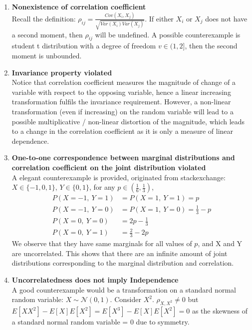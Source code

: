 \documentclass[12pt]{report}
\newcommand{\1}{\mathbf{1}}
\begin{document}
\begin{flushleft}
\begin{enumerate}
\item \textbf{Nonexistence of correlation coefficient} \\
\vspace{0.5cm}
Recall the definition: $\rho_{ij} = \frac{Cov(X_{i},X_{j})}{\sqrt{Var(X_{i})Var(X_{j})}}$. If either $X_{i}$ or $X_{j}$ does not have a second moment, then $\rho_{ij}$ will be undefined. A possible counterexample is student t distribution with a degree of freedom $v \in (1,2]$, then the second moment is unbounded.
\item \textbf{Invariance property violated} \\
\vspace{0.5cm}
Notice that correlation coefficient measures the magnitude of change of a variable with respect to the opposing variable, hence a linear increasing transformation fulfils the invariance requirement. However, a non-linear transformation (even if increasing) on the random variable will lead to a possible multiplicative / non-linear distortion of the magnitude, which leads to a change in the correlation coefficient as it is only a measure of linear dependence. 
\item \textbf{One-to-one correspondence between marginal distributions and correlation coefficient on the joint distribution violated}\\
\vspace{0.5cm}
A elegant counterexample is provided, originated from stackexchange: \parencite{4665041} \\
$X \in \{-1, 0, 1 \}$, $Y \in \{0, 1\}$, for any $p \in (\frac{1}{6},\frac{1}{3})$,
\begin{align*}
P(X = -1, \: Y = 1) &= P(X = 1, \: Y = 1) = p \\
P(X = -1, \: Y = 0) &= P(X = 1, \: Y = 0) = \frac{1}{3} - p \\
P(X = 0, \: Y = 0) &= 2p - \frac{1}{3} \\
P(X = 0, \: Y = 1) &= \frac{2}{3} - 2p 
\end{align*}
We observe that they have same marginals for all values of $p$, and X and Y are uncorrelated. This shows that there are an infinite amount of joint distributions corresponding to the marginal distribution and correlation.\\
    
\item \textbf{Uncorrelatedness does not imply Independence}\\
\vspace{0.5cm}
A good counterexample would be a transformation on a standard normal random variable:
$X \sim \mathcal{N}(0,1)$. Consider $X^{2}$. $\rho_{X, X^{2}} \neq 0$ but $E[XX^{2}] - E[X]E[X^{2}] = E[X^{3}] - E[X]E[X^{2}] = 0$ as the skewness of a standard normal random variable = 0 due to symmetry.


\end{enumerate}
\end{flushleft}
\end{document}
